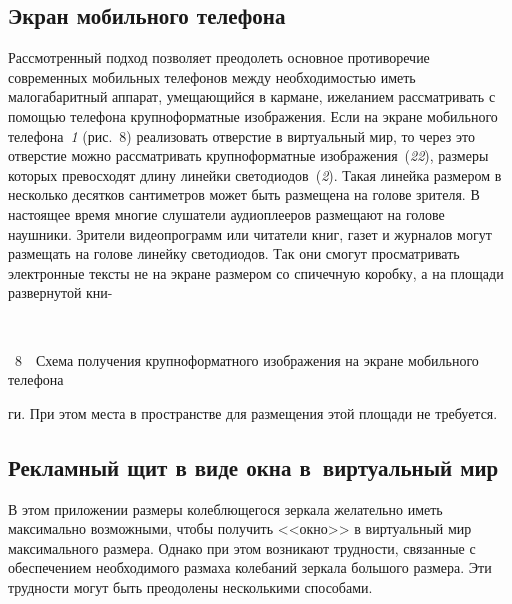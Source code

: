 \begin{multicols}{2}
\subsection{Экран мобильного телефона}
  
  Рассмотренный подход позволяет преодолеть основное противоречие современных 
мобильных телефонов между необходимостью иметь малогабаритный аппарат, 
умещающийся в кармане, и\linebreak желанием рассматривать с помощью телефона 
крупноформатные изображения. Если на экране мобильного телефона~\textit{1} 
(рис.~8) реализовать отверстие в виртуальный мир, то через это отверстие можно 
рассматривать крупноформатные изображения~(\textit{22}), размеры которых превосходят длину 
линейки светодиодов~(\textit{2}). Такая линейка размером в несколько десятков сантиметров 
может быть размещена на голове зрителя. В настоящее время многие слушатели 
аудиоплееров размещают на голове наушники. Зрители видеопрограмм или читатели 
книг, газет и журналов могут размещать на голове линейку светодиодов. Так они смогут 
просматривать электронные тексты не на экране размером со спичечную коробку, а на 
площади развернутой кни-



\begin{center}
\vspace*{12pt}
\mbox{%
\epsfxsize=70.623mm
}
\end{center}
\vspace*{2pt}
{{\figurename~8}\ \ \small{Схема получения крупноформатного изображения на экране мобильного телефона}}


\bigskip
\addtocounter{figure}{1}  

\noindent
ги. При этом места в пространстве для размещения этой 
площади не требуется. 

\vspace*{-4pt}

\subsection{Рекламный щит в виде окна в~виртуальный мир}

  В этом приложении размеры колеблющегося зеркала желательно иметь максимально 
возможными, чтобы получить <<окно>> в виртуальный мир максимального размера. 
Однако при этом возникают трудности, связанные с обеспечением необходимого размаха 
колебаний зеркала большого размера. Эти трудности могут быть преодолены несколькими 
способами. 
 

\end{multicols}
